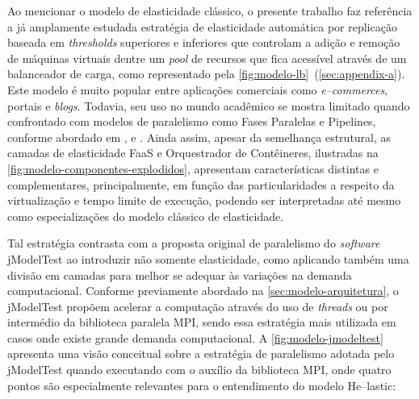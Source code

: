 \documentclass[english,brazilian]{UNISINOSmonografia} %
\begin{document}
Ao mencionar o modelo de elasticidade clássico, o presente trabalho faz referência a já amplamente estudada estratégia de elasticidade automática por replicação baseada em \textit{thresholds} superiores e inferiores que controlam a adição e remoção de máquinas virtuais dentre um \textit{pool} de recursos que fica acessível através de um balanceador de carga, como representado pela \autoref{fig:modelo-lb}~(\autoref{sec:appendix-a}).
Este modelo é muito popular entre aplicações comerciais como \textit{e--commerces}, portais e \textit{blogs}.
Todavia, seu uso no mundo acadêmico se mostra limitado quando confrontado com modelos de paralelismo como Fases Paralelas e Pipelines, conforme abordado em ,  e .
Ainda assim, apesar da semelhança estrutural, as camadas de elasticidade FaaS e Orquestrador de Contêineres, ilustradas na \autoref{fig:modelo-componentes-explodidos}, apresentam características distintas e complementares, principalmente, em função das particularidades a respeito da virtualização e tempo limite de execução, podendo ser interpretadas até mesmo como especializações do modelo clássico de elasticidade.



Tal estratégia contrasta com a proposta original de paralelismo do \textit{software} jModelTest ao introduzir não somente elasticidade, como aplicando também uma divisão em camadas para melhor se adequar às variações na demanda computacional.
Conforme previamente abordado na \autoref{sec:modelo-arquitetura}, o jModelTest propõem acelerar a computação através do uso de \textit{threads} ou por intermédio da biblioteca paralela MPI, sendo essa estratégia mais utilizada em casos onde existe grande demanda computacional.
A \autoref{fig:modelo-jmodeltest} apresenta uma visão conceitual sobre a estratégia de paralelismo adotada pelo jModelTest quando executando com o auxílio da biblioteca MPI, onde quatro pontos são especialmente relevantes para o entendimento do modelo \textsf{He}--lastic:
\end{document}
